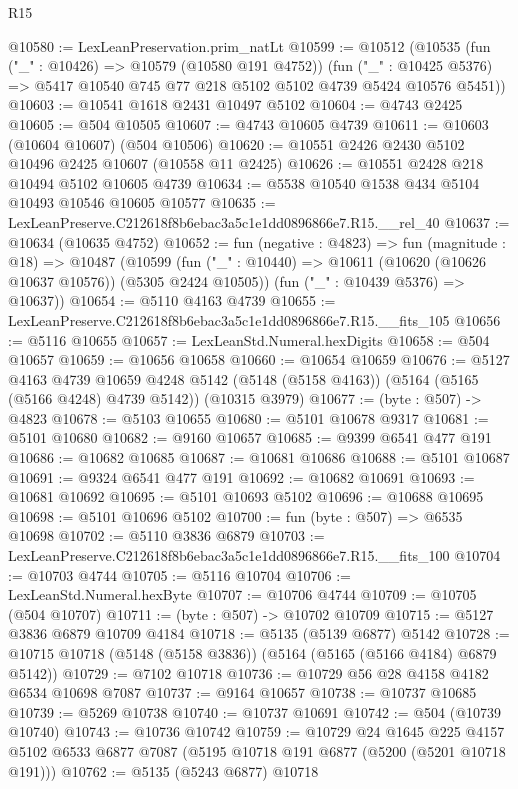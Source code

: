 \begin{lexlean}{R15}
\begin{coremodule}
{{{{{{{{{{{@10580 := LexLeanPreservation.prim_natLt
@10599 := @10512
    (@10535
      (fun ("_" : @10426) => @10579 (@10580 @191 @4752))
      (fun ("_" : @10425 @5376) => @5417 @10540 @745 @77 @218 @5102 @5102 @4739 @5424 @10576 @5451))
@10603 := @10541 @1618 @2431 @10497 @5102
@10604 := @4743 @2425
@10605 := @504 @10505
@10607 := @4743 @10605 @4739
@10611 := @10603 (@10604 @10607) (@504 @10506)
@10620 := @10551 @2426 @2430 @5102 @10496 @2425 @10607 (@10558 @11 @2425)
@10626 := @10551 @2428 @218 @10494 @5102 @10605 @4739
@10634 := @5538 @10540 @1538 @434 @5104 @10493 @10546 @10605 @10577
@10635 := LexLeanPreserve.C212618f8b6ebac3a5c1e1dd0896866e7.R15.__rel_40
@10637 := @10634 (@10635 @4752)
@10652 := fun (negative : @4823) =>
  fun (magnitude : @18) =>
  @10487
    (@10599
      (fun ("_" : @10440) => @10611 (@10620 (@10626 @10637 @10576)) (@5305 @2424 @10505))
      (fun ("_" : @10439 @5376) => @10637))
@10654 := @5110 @4163 @4739
@10655 := LexLeanPreserve.C212618f8b6ebac3a5c1e1dd0896866e7.R15.__fits_105
@10656 := @5116 @10655
@10657 := LexLeanStd.Numeral.hexDigits
@10658 := @504 @10657
@10659 := @10656 @10658
@10660 := @10654 @10659
@10676 := @5127
    @4163
    @4739
    @10659
    @4248
    @5142
    (@5148 (@5158 @4163))
    (@5164 (@5165 (@5166 @4248) @4739 @5142))
    (@10315 @3979)
@10677 := (byte : @507) -> @4823
@10678 := @5103 @10655
@10680 := @5101 @10678 @9317
@10681 := @5101 @10680
@10682 := @9160 @10657
@10685 := @9399 @6541 @477 @191
@10686 := @10682 @10685
@10687 := @10681 @10686
@10688 := @5101 @10687
@10691 := @9324 @6541 @477 @191
@10692 := @10682 @10691
@10693 := @10681 @10692
@10695 := @5101 @10693 @5102
@10696 := @10688 @10695
@10698 := @5101 @10696 @5102
@10700 := fun (byte : @507) => @6535 @10698
@10702 := @5110 @3836 @6879
@10703 := LexLeanPreserve.C212618f8b6ebac3a5c1e1dd0896866e7.R15.__fits_100
@10704 := @10703 @4744
@10705 := @5116 @10704
@10706 := LexLeanStd.Numeral.hexByte
@10707 := @10706 @4744
@10709 := @10705 (@504 @10707)
@10711 := (byte : @507) -> @10702 @10709
@10715 := @5127 @3836 @6879 @10709 @4184
@10718 := @5135 (@5139 @6877) @5142
@10728 := @10715 @10718 (@5148 (@5158 @3836)) (@5164 (@5165 (@5166 @4184) @6879 @5142))
@10729 := @7102 @10718
@10736 := @10729 @56 @28 @4158 @4182 @6534 @10698 @7087
@10737 := @9164 @10657
@10738 := @10737 @10685
@10739 := @5269 @10738
@10740 := @10737 @10691
@10742 := @504 (@10739 @10740)
@10743 := @10736 @10742
@10759 := @10729
    @24
    @1645
    @225
    @4157
    @5102
    @6533
    @6877
    @7087
    (@5195 @10718 @191 @6877 (@5200 (@5201 @10718 @191)))
@10762 := @5135 (@5243 @6877) @10718
}}}}}}}}}}}
\end{coremodule}
\end{lexlean}
